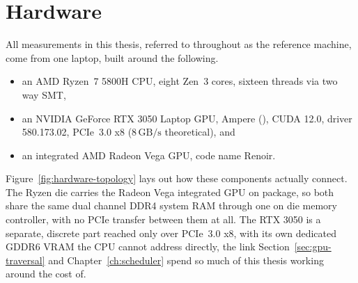 \documentclass{ftndiplomski}
\begin{document}
\section{Hardware}
\label{sec:hardware}

All measurements in this thesis, referred to throughout as the reference
machine, come from one laptop, built around the following.
\begin{itemize}
  \item an AMD Ryzen~7 5800H CPU, eight Zen~3 cores, sixteen threads via
  two way SMT,
  \item an NVIDIA GeForce RTX 3050 Laptop GPU, Ampere (), CUDA
  12.0, driver 580.173.02, PCIe~3.0 x8 ($8\,\mathrm{GB/s}$ theoretical), and
  \item an integrated AMD Radeon Vega GPU, code name Renoir.
\end{itemize}

Figure~\ref{fig:hardware-topology} lays out how these components actually
connect. The Ryzen die carries the Radeon Vega integrated GPU on package,
so both share the same dual channel DDR4 system RAM through one on die
memory controller, with no PCIe transfer between them at all. The RTX
3050 is a separate, discrete part reached only over PCIe~3.0 x8, with its
own dedicated GDDR6 VRAM the CPU cannot address directly, the link
Section~\ref{sec:gpu-traversal} and Chapter~\ref{ch:scheduler} spend so
much of this thesis working around the cost of.
\end{document}
